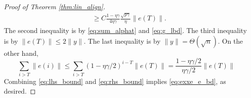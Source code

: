 \begin{proof}[Proof of Theorem \ref{thm:lin_align}]
\begin{equation}
\begin{aligned}
    &\geq C\frac{1-\eta\gamma}{4\eta\gamma}\frac{\sqrt {p\gamma}}{\eta}\|e(T)\|.
\end{aligned}
\end{equation}
The second inequality is by \eqref{eq:sum_alphat} and \eqref{eq:g_lbd}. The third inequality is by $\|e(T)\|\leq 2\|y\|$. The last inequality is by $\|y\| = \Theta(\sqrt n)$. On the other hand,
\begin{equation}
\label{eq:rhs_bound}
\sum_{i>T}\|e(i)\| \leq \sum_{i>T}(1-\eta\gamma/2)^{i-T}\|e(T)\| =\frac{1-\eta\gamma/2}{\eta\gamma/2}\|e(T)\|
\end{equation}
Combining \eqref{eq:lhs_bound} and \eqref{eq:rhs_bound} implies \eqref{eq:exxe_e_bd}, as desired.
\end{proof}
